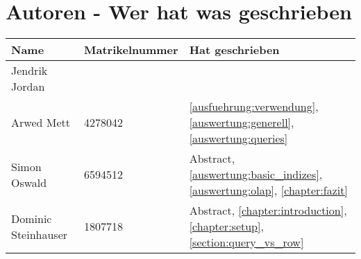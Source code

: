 \chapter{Autoren - Wer hat was geschrieben}
\begin{table}[H]
	\centering
	\begin{tabularx}{\textwidth}{llX}
		\toprule
		Name                &	Matrikelnummer  & Hat geschrieben \\
		\toprule
		Jendrik Jordan      &                   & \\
		Arwed Mett          &   4278042         & \autoref{ausfuehrung:verwendung}, \autoref{auswertung:generell}, \autoref{auswertung:queries} \\
		Simon Oswald        &   6594512         & Abstract, \autoref{auswertung:basic_indizes}, \autoref{auswertung:olap}, \autoref{chapter:fazit} \\
		Dominic Steinhauser &   1807718         & Abstract, \autoref{chapter:introduction}, \autoref{chapter:setup}, \autoref{section:query_vs_row} \\
		\bottomrule
	\end{tabularx}
	\label{tab:autoren}
\end{table}

